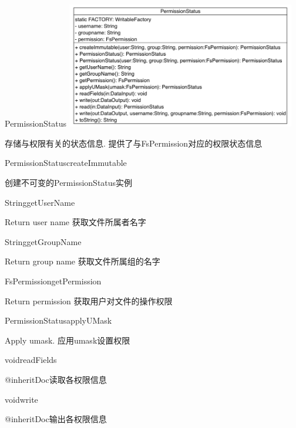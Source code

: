 \begin{XeClass}{PermissionStatus}
\includegraphics[width=10cm]{cdig/PermissionStatus.png}
     
 存储与权限有关的状态信息.
 提供了与FsPermission对应的权限状态信息

    \begin{XeMethod}{\XePublic}{PermissionStatus}{createImmutable}
         
 创建不可变的PermissionStatus实例 

    \end{XeMethod}

    \begin{XeMethod}{\XePublic}{String}{getUserName}
         
 Return user name
 获取文件所属者名字

    \end{XeMethod}

    \begin{XeMethod}{\XePublic}{String}{getGroupName}
         
 Return group name
 获取文件所属组的名字

    \end{XeMethod}

    \begin{XeMethod}{\XePublic}{FsPermission}{getPermission}
         
 Return permission
 获取用户对文件的操作权限

    \end{XeMethod}

    \begin{XeMethod}{\XePublic}{PermissionStatus}{applyUMask}
         
 Apply umask.
 应用umask设置权限

    \end{XeMethod}

    \begin{XeMethod}{\XePublic}{void}{readFields}
         
 {@inheritDoc}读取各权限信息

    \end{XeMethod}

    \begin{XeMethod}{\XePublic}{void}{write}
         
 {@inheritDoc}输出各权限信息

    \end{XeMethod}

\end{XeClass}

